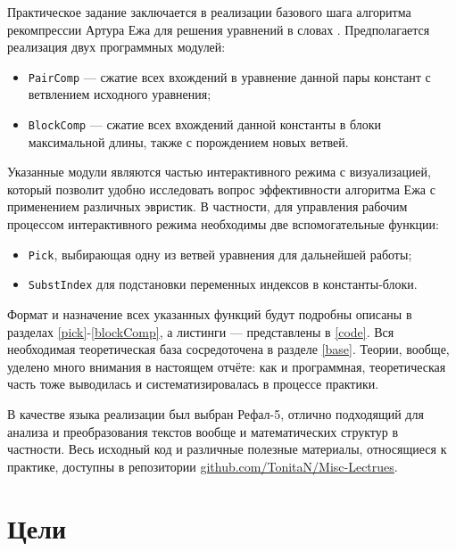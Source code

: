 \documentclass[12pt]{article}
\begin{document}
Практическое задание заключается в реализации базового шага алгоритма
рекомпрессии Артура Ежа для решения уравнений в словах \cite{jez}.
Предполагается реализация двух программных модулей:
\begin{itemize}
\item \texttt{PairComp} --- сжатие всех вхождений в уравнение данной пары
констант с ветвлением исходного уравнения;
\item \texttt{BlockComp} --- сжатие всех вхождений данной константы в блоки
максимальной длины, также с порождением новых ветвей.
\end{itemize}
Указанные модули являются частью интерактивного режима с визуализацией,
который позволит удобно исследовать вопрос эффективности алгоритма Ежа с
применением различных эвристик. В частности, для управления рабочим процессом
интерактивного режима необходимы две вспомогательные функции:
\begin{itemize}
\item \texttt{Pick}, выбирающая одну из ветвей уравнения для дальнейшей работы;
\item \texttt{SubstIndex} для подстановки переменных индексов в константы-блоки.
\end{itemize}
Формат и назначение всех указанных функций будут подробны описаны в разделах 
\ref{pick}-\ref{blockComp}, а листинги --- представлены в \ref{code}. Вся
необходимая теоретическая база сосредоточена в разделе \ref{base}. Теории,
вообще, уделено много внимания в настоящем отчёте: как и программная,
теоретическая часть тоже выводилась и систематизировалась в процессе практики.

В качестве языка реализации был выбран Рефал-5, отлично подходящий для анализа
и преобразования текстов вообще и математических структур в частности. Весь
исходный код и различные полезные материалы, относящиеся к практике, доступны
в репозитории \href{https://github.com/TonitaN/Misc-Lectures}
{github.com/TonitaN/Misc-Lectrues}.



\section{Цели}
\end{document}
